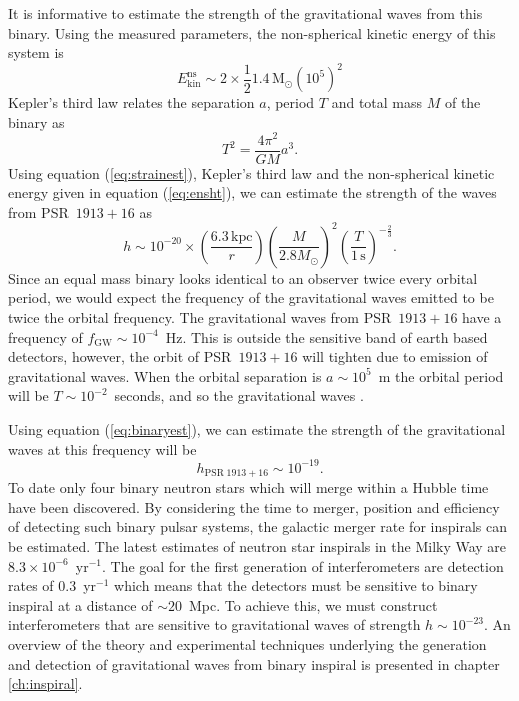 It is informative to estimate the strength of the gravitational waves from
this binary. Using the measured parameters, the non-spherical kinetic energy
of this system is 
\begin{equation}
E_\mathrm{kin}^\mathrm{ns} \sim 
2 \times \frac{1}{2} 1.4\,\mathrm{M}_\odot (10^5)^2
\label{eq:ensht}
\end{equation}
Kepler's third law relates the separation $a$, period $T$ and total mass $M$
of the binary as
\begin{equation}
T^2 = \frac{4\pi^2}{GM}a^3.
\label{eq:kep3}
\end{equation}
Using equation (\ref{eq:strainest}), Kepler's third law and the non-spherical
kinetic energy given in equation (\ref{eq:ensht}), we can estimate the 
strength of the waves from PSR~$1913+16$ as
\begin{equation}
h \sim 10^{-20} \times 
\left(\frac{6.3\,\mathrm{kpc}}{r}\right)
\left(\frac{M}{2.8M_\odot}\right)^2 
\left(\frac{T}{1\,\mathrm{s}}\right)^{-\frac{2}{3}}.
\label{eq:binaryest}
\end{equation}
Since an equal mass binary looks identical to an observer twice every orbital
period, we would expect the frequency of the gravitational waves emitted to be
twice the orbital frequency. The gravitational waves from PSR~$1913+16$ have a
frequency of $f_\mathrm{GW} \sim 10^{-4}$~Hz. This is outside the sensitive
band of earth based detectors, however, the orbit of PSR~$1913+16$ will
tighten due to emission of gravitational waves.  When the orbital separation
is $a \sim 10^5$~m the orbital period will be $T\sim10^{-2}$~seconds, and so
the gravitational waves . 



Using equation (\ref{eq:binaryest}), we
can estimate the strength of the gravitational waves at this frequency
will be
\begin{equation}
h_{\mathrm{PSR}\;1913+16} \sim 10^{-19}.
\label{eq:hbns}
\end{equation}
To date only four binary neutron stars which will merge within a Hubble time
have been discovered.  By considering the time to merger, position and
efficiency of detecting such binary pulsar systems, the galactic merger rate
for inspirals can be estimated\cite{Phinney:1991ei}.  The latest estimates of
neutron star inspirals in the Milky Way are $8.3 \times 10^{-6}$~yr$^{-1}$. The
goal for the first generation of interferometers are detection rates of
$0.3$~yr$^{-1}$ which means that the detectors must be sensitive to binary
inspiral at a distance of $\sim 20$~Mpc. To achieve this, we must construct
interferometers that are sensitive to gravitational waves of strength $h \sim
10^{-23}$. An overview of the theory and experimental techniques underlying
the generation and detection of gravitational waves from binary inspiral is
presented in chapter \ref{ch:inspiral}.

